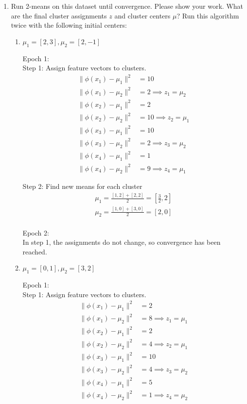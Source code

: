 \documentclass[10pt]{article}
\begin{document}
\begin{enumerate}[label=(\alph*)]

	\item Run 2-means on this dataset until convergence. Please show your work. What are the final cluster assignments $z$ and cluster centers $\mu$? Run this algorithm twice with the following initial centers:
	\begin{enumerate}[label=(\arabic*)]
	
	\item $\mu_1 = [2, 3], \mu_2 = [2, -1]$

	Epoch 1:\\
	Step 1: Assign feature vectors to clusters.
	\begin{align*}
	\lVert \phi(x_1) - \mu_1 \rVert^2 &= 10\\
	\lVert \phi(x_1) - \mu_2 \rVert^2 &= 2 \implies z_1 = \mu_2\\
	\lVert \phi(x_2) - \mu_1 \rVert^2 &= 2\\
	\lVert \phi(x_2) - \mu_2 \rVert^2 &= 10 \implies z_2 = \mu_1\\
	\lVert \phi(x_3) - \mu_1 \rVert^2 &= 10\\
	\lVert \phi(x_3) - \mu_2 \rVert^2 &= 2 \implies z_3 = \mu_2\\
	\lVert \phi(x_4) - \mu_1 \rVert^2 &= 1\\
	\lVert \phi(x_4) - \mu_2 \rVert^2 &= 9 \implies z_4 = \mu_1
	\end{align*}
	
	Step 2: Find new means for each cluster
	\begin{align*}
	\mu_1 = \frac{[1, 2] + [2, 2]}{2} = [\frac{3}{2}, 2]\\
	\mu_2 = \frac{[1, 0] + [3, 0]}{2} = [2, 0]\\
	\end{align*}
	
	Epoch 2:\\
	In step 1, the assignments do not change, so convergence has been reached.
	
	\item $\mu_1 = [0, 1], \mu_2 = [3, 2]$

	Epoch 1:\\
	Step 1: Assign feature vectors to clusters.
	\begin{align*}
	\lVert \phi(x_1) - \mu_1 \rVert^2 &= 2\\
	\lVert \phi(x_1) - \mu_2 \rVert^2 &= 8 \implies z_1 = \mu_1\\
	\lVert \phi(x_2) - \mu_1 \rVert^2 &= 2\\
	\lVert \phi(x_2) - \mu_2 \rVert^2 &= 4 \implies z_2 = \mu_1\\
	\lVert \phi(x_3) - \mu_1 \rVert^2 &= 10\\
	\lVert \phi(x_3) - \mu_2 \rVert^2 &= 4 \implies z_3 = \mu_2\\
	\lVert \phi(x_4) - \mu_1 \rVert^2 &= 5\\
	\lVert \phi(x_4) - \mu_2 \rVert^2 &= 1 \implies z_4 = \mu_2
	\end{align*}
	

\end{enumerate}
\end{enumerate}
\end{document}
